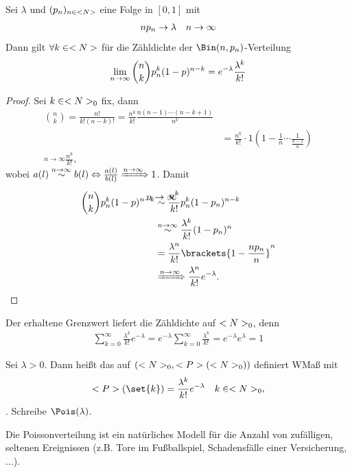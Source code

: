 \begin{proposition}
	Sei $\lambda$ und $(p_n)_{n\in<N>}$ eine Folge in $[0,1]$ mit
	\begin{align}
		np_n \to \lambda \quad n \to \infty\notag
	\end{align}
	Dann gilt $\forall k \in <N>$ für die Zähldichte der $\Bin(n,p_n)$-Verteilung
	\begin{align}
		\lim_{n \to \infty} \binom{n}{k}p_n^k(1-p)^{n-k} = e^{-\lambda} \frac{\lambda^k}{k!}\notag
	\end{align}
\end{proposition}
\begin{proof}
	Sei $k \in <N>_{0}$ fix, dann
	\begin{align}
		\binom{n}{k} = \frac{n!}{k!(n-k)!} = \frac{n^k}{k!}\frac{n(n-1)\cdots(n-k+1)}{n^k}\\
		&= \frac{n^k}{k!}\cdot 1 (1-\frac{1}{n}\cdots \frac{1}{\frac{k-1}{n}})\\
		\overset{n \to \infty}{~} \frac{n^k}{k!},
	\end{align}
	wobei $a(l) \overset{n \to \infty}{\sim} b(l) \Leftrightarrow \frac{a(l)}{b(l)} \xRightarrow{n\to \infty} 1$. Damit
	\begin{align}
		\binom{n}{k}p_n^k (1-p)^{n-k} &\overset{\clap{$n \to \infty$}}{\sim} \frac{n^k}{k!}p_n^k(1-p_n)^{n-k}\\
		&\overset{n \to \infty}{\sim} \frac{\lambda^k}{k!}(1-p_n)^n\\
		&= \frac{\lambda^n}{k!}\brackets{1 - \frac{np_n}{n}}^n\\
		&\xRightarrow{n \to \infty} \frac{\lambda^n}{k!}e^{-\lambda}.
	\end{align}
\end{proof}
Der erhaltene Grenzwert liefert die Zähldichte auf $<N>_{0}$, denn 
\begin{align}
	\sum_{k=0}^{\infty}\frac{\lambda^k}{k!}e^{-\lambda} = e^{-\lambda}\sum_{k=0}^{\infty}\frac{\lambda^{k}}{k!} = e^{-\lambda}e^{\lambda} = 1
\end{align}
\begin{definition}
	Sei $\lambda >0$. Dann heißt das auf $(<N>_{0}, <P>(<N>_{0}))$ definiert WMaß mit
	\begin{align}
		\probp(\set{k}) = \frac{\lambda^k}{k!}e^{-\lambda} \quad k \in \N_{0},
	\end{align}
	. Schreibe $\Pois(\lambda)$.
\end{definition}
Die Poissonverteilung ist ein natürliches Modell für die Anzahl von zufälligen, seltenen Ereignissen (z.B. Tore im Fußballspiel, Schadensfälle einer Versicherung, ...).